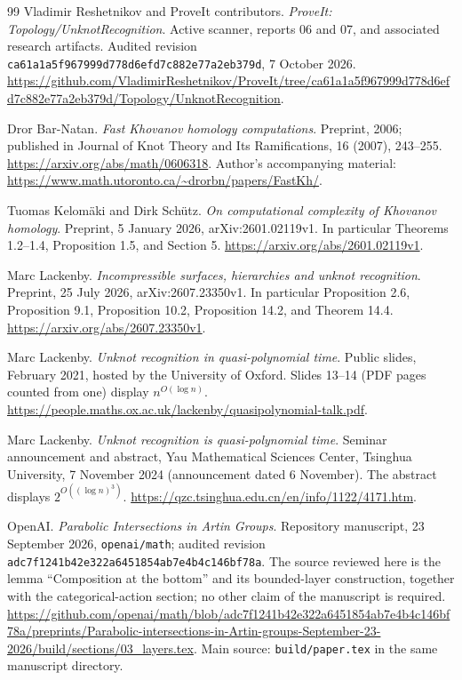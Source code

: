 \clearpage
{}
\begin{thebibliography}{99}
Vladimir Reshetnikov and ProveIt contributors.
\emph{ProveIt: Topology/UnknotRecognition}.
Active scanner, reports 06 and 07, and associated research artifacts.
Audited revision \texttt{ca61a1a5f967999d778d6efd7c882e77a2eb379d},
7 October 2026.
\url{https://github.com/VladimirReshetnikov/ProveIt/tree/ca61a1a5f967999d778d6efd7c882e77a2eb379d/Topology/UnknotRecognition}.

Dror Bar-Natan.
\emph{Fast Khovanov homology computations}.
Preprint, 2006; published in Journal of Knot Theory and Its Ramifications,
16 (2007), 243--255.
\url{https://arxiv.org/abs/math/0606318}.
Author's accompanying material:
\url{https://www.math.utoronto.ca/~drorbn/papers/FastKh/}.

Tuomas Kelom\"aki and Dirk Sch\"utz.
\emph{On computational complexity of Khovanov homology}.
Preprint, 5 January 2026, arXiv:2601.02119v1.
In particular Theorems 1.2--1.4, Proposition 1.5, and Section 5.
\url{https://arxiv.org/abs/2601.02119v1}.

Marc Lackenby.
\emph{Incompressible surfaces, hierarchies and unknot recognition}.
Preprint, 25 July 2026, arXiv:2607.23350v1.
In particular Proposition 2.6, Proposition 9.1, Proposition 10.2,
Proposition 14.2, and Theorem 14.4.
\url{https://arxiv.org/abs/2607.23350v1}.

Marc Lackenby.
\emph{Unknot recognition in quasi-polynomial time}.
Public slides, February 2021, hosted by the
University of Oxford.  Slides 13--14 (PDF pages counted from one)
display $n^{O(\log n)}$.
\url{https://people.maths.ox.ac.uk/lackenby/quasipolynomial-talk.pdf}.

Marc Lackenby.
\emph{Unknot recognition is quasi-polynomial time}.
Seminar announcement and abstract, Yau Mathematical Sciences Center,
Tsinghua University, 7 November 2024 (announcement dated 6 November).
The abstract displays $2^{O((\log n)^3)}$.
\url{https://qzc.tsinghua.edu.cn/en/info/1122/4171.htm}.

OpenAI.
\emph{Parabolic Intersections in Artin Groups}.
Repository manuscript, 23 September 2026, \texttt{openai/math};
audited revision \texttt{adc7f1241b42e322a6451854ab7e4b4c146bf78a}.
The source reviewed here is the lemma ``Composition at the bottom'' and
its bounded-layer construction, together with the categorical-action
section; no other claim of the manuscript is required.
\url{https://github.com/openai/math/blob/adc7f1241b42e322a6451854ab7e4b4c146bf78a/preprints/Parabolic-intersections-in-Artin-groups-September-23-2026/build/sections/03_layers.tex}.
Main source: \texttt{build/paper.tex} in the same manuscript directory.


\end{thebibliography}
